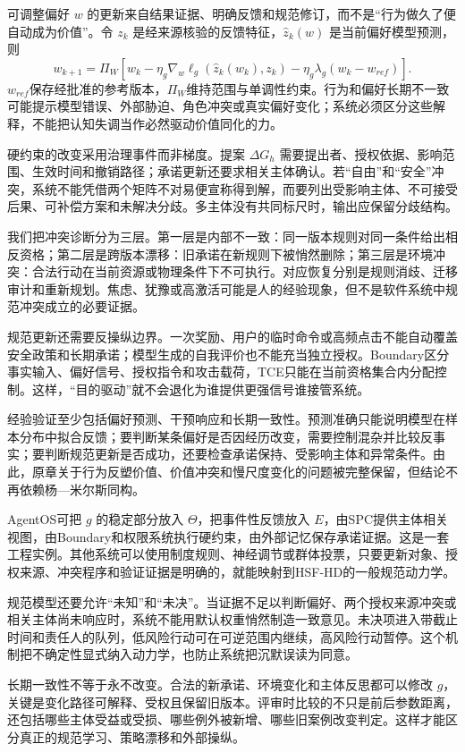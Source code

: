 可调整偏好 $w$ 的更新来自结果证据、明确反馈和规范修订，而不是“行为做久了便自动成为价值”。令 $z_k$ 是经来源核验的反馈特征，$\hat z_k(w)$ 是当前偏好模型预测，则
\begin{equation}
w_{k+1}=\Pi_W\left[w_k-\eta_g\nabla_w\ell_g(\hat z_k(w_k),z_k)-\eta_g\lambda_g(w_k-w_{ref})\right].
\end{equation}
$w_{ref}$保存经批准的参考版本，$\Pi_W$维持范围与单调性约束。行为和偏好长期不一致可能提示模型错误、外部胁迫、角色冲突或真实偏好变化；系统必须区分这些解释，不能把认知失调当作必然驱动价值同化的力。

硬约束的改变采用治理事件而非梯度。提案 $\Delta G_h$ 需要提出者、授权依据、影响范围、生效时间和撤销路径；承诺更新还要求相关主体确认。若“自由”和“安全”冲突，系统不能凭借两个矩阵不对易便宣称得到解，而要列出受影响主体、不可接受后果、可补偿方案和未解决分歧。多主体没有共同标尺时，输出应保留分歧结构。

我们把冲突诊断分为三层。第一层是内部不一致：同一版本规则对同一条件给出相反资格；第二层是跨版本漂移：旧承诺在新规则下被悄然删除；第三层是环境冲突：合法行动在当前资源或物理条件下不可执行。对应恢复分别是规则消歧、迁移审计和重新规划。焦虑、犹豫或高激活可能是人的经验现象，但不是软件系统中规范冲突成立的必要证据。

规范更新还需要反操纵边界。一次奖励、用户的临时命令或高频点击不能自动覆盖安全政策和长期承诺；模型生成的自我评价也不能充当独立授权。Boundary区分事实输入、偏好信号、授权指令和攻击载荷，TCE只能在当前资格集合内分配控制。这样，“目的驱动”就不会退化为谁提供更强信号谁接管系统。

经验验证至少包括偏好预测、干预响应和长期一致性。预测准确只能说明模型在样本分布中拟合反馈；要判断某条偏好是否因经历改变，需要控制混杂并比较反事实；要判断规范更新是否成功，还要检查承诺保持、受影响主体和异常条件。由此，原章关于行为反塑价值、价值冲突和慢尺度变化的问题被完整保留，但结论不再依赖杨—米尔斯同构。

AgentOS可把 $g$ 的稳定部分放入 $\Theta$，把事件性反馈放入 $E$，由SPC提供主体相关视图，由Boundary和权限系统执行硬约束，由外部记忆保存承诺证据。这是一套工程实例。其他系统可以使用制度规则、神经调节或群体投票，只要更新对象、授权来源、冲突程序和验证证据是明确的，就能映射到HSF-HD的一般规范动力学。

规范模型还要允许“未知”和“未决”。当证据不足以判断偏好、两个授权来源冲突或相关主体尚未响应时，系统不能用默认权重悄然制造一致意见。未决项进入带截止时间和责任人的队列，低风险行动可在可逆范围内继续，高风险行动暂停。这个机制把不确定性显式纳入动力学，也防止系统把沉默误读为同意。

长期一致性不等于永不改变。合法的新承诺、环境变化和主体反思都可以修改 $g$，关键是变化路径可解释、受权且保留旧版本。评审时比较的不只是前后参数距离，还包括哪些主体受益或受损、哪些例外被新增、哪些旧案例改变判定。这样才能区分真正的规范学习、策略漂移和外部操纵。

